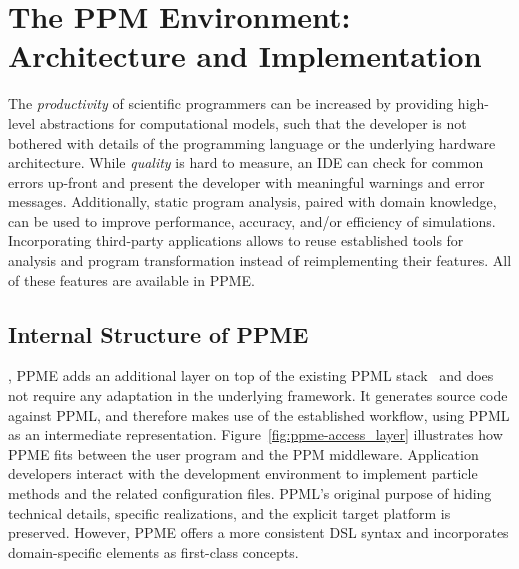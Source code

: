 
\section{The PPM Environment: Architecture and Implementation}
\label{sec:implementation_use_cases}
The \emph{productivity} of scientific programmers can be increased by providing high-level abstractions for
computational models, such that the developer is not bothered with details of the programming language
or the underlying hardware architecture. While \emph{quality} is hard to measure, an IDE can check for common errors up-front and present the developer with meaningful warnings
and error messages. Additionally, static program analysis, paired with domain knowledge, can be used to
improve performance, accuracy, and/or efficiency of simulations.
Incorporating third-party applications allows
to reuse established tools for analysis and program transformation instead of reimplementing their features. 
All of these features are available in PPME.

\subsection{Internal Structure of PPME}
, PPME adds an additional layer on top of the existing PPML 
stack~\cite{Sbalzarini2006a,Awile:2013a} and does not require any adaptation in the underlying framework.
It generates source code against PPML, and therefore makes use of the established workflow, using PPML
as an intermediate representation. Figure~\ref{fig:ppme-access_layer} illustrates how PPME fits between
the user program and the PPM middleware. Application developers interact with the development environment
to implement particle methods and the related configuration files. %
PPML's original purpose of hiding technical details, specific realizations, and the explicit target platform
is preserved. However, PPME offers a more consistent DSL syntax and incorporates domain-specific
elements as first-class concepts.

